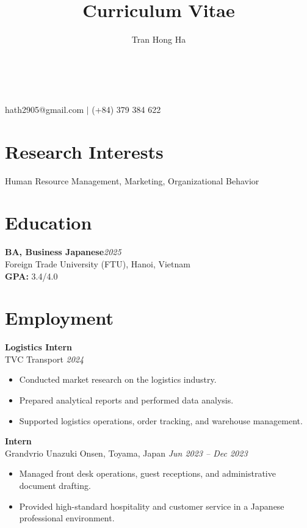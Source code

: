 \documentclass[10.5pt]{article}
\makeatletter
\newcommand{\cvcolor}{\color{DodgerBlue4}} %
\renewcommand{\maketitle}{
\begin{center}
{\Huge\theauthor}\\
\vspace{0.5em}
{\Large \cvcolor{Curriculum Vitae}}\\
{\color{Gray}hath2905@gmail.com $|$ (+84) 379 384 622}
\end{center}
}
\makeatother
\begin{document}
\title{Curriculum Vitae} %
\author{Tran Hong Ha}

\maketitle


\section{Research Interests}
Human Resource Management, Marketing, Organizational Behavior


\section{Education}

\textbf{BA, Business Japanese}\hfill\emph{2025}\\
Foreign Trade University (FTU), Hanoi, Vietnam \\
\textbf{GPA:} 3.4/4.0


\section{Employment}

\textbf{Logistics Intern} \hfill \\
TVC Transport \hfill \emph{2024}
\vspace{-0.5em}
\begin{itemize}
\item Conducted market research on the logistics industry.
\item Prepared analytical reports and performed data analysis.
\item Supported logistics operations, order tracking, and warehouse management.
\end{itemize}

\textbf{Intern} \hfill \\
Grandvrio Unazuki Onsen, Toyama, Japan \hfill \emph{Jun 2023 -- Dec 2023}
\vspace{-0.5em}
\begin{itemize}
\item Managed front desk operations, guest receptions, and administrative document drafting.
\item Provided high-standard hospitality and customer service in a Japanese professional environment.
\end{itemize}
\end{document}
